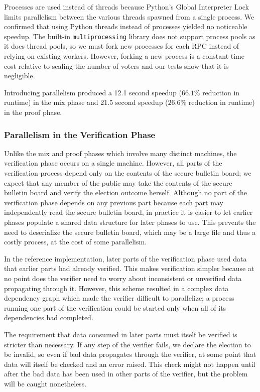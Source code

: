 Processes are used instead of threads because Python's Global Interpreter Lock limits parallelism between the various threads spawned from a single process. We confirmed that using Python threads instead of processes yielded no noticeable speedup. The built-in \texttt{multiprocessing} library does not support process pools as it does thread pools, so we must fork new processes for each RPC instead of relying on existing workers. However, forking a new process is a constant-time cost relative to scaling the number of voters and our tests show that it is negligible.

Introducing parallelism produced a 12.1 second speedup ($66.1\%$ reduction in runtime) in the mix phase and 21.5 second speedup ($26.6\%$ reduction in runtime) in the proof phase.

\subsubsection{Parallelism in the Verification Phase}

Unlike the mix and proof phases which involve many distinct machines, the verification phase occurs on a single machine. However, all parts of the verification process depend only on the contents of the secure bulletin board; we expect that any member of the public may take the contents of the secure bulletin board and verify the election outcome herself. Although no part of the verification phase depends on any previous part because each part may independently read the secure bulletin board, in practice it is easier to let earlier phases populate a shared data structure for later phases to use. This prevents the need to deserialize the secure bulletin board, which may be a large file and thus a costly process, at the cost of some parallelism.

In the reference implementation, later parts of the verification phase used data that earlier parts had already verified. This makes verification simpler because at no point does the verifier need to worry about inconsistent or unverified data propagating through it. However, this scheme resulted in a complex data dependency graph which made the verifier difficult to parallelize; a process running one part of the verification could be started only when all of its dependencies had completed.

The requirement that data consumed in later parts must itself be verified is stricter than necessary. If any step of the verifier fails, we declare the election to be invalid, so even if bad data propagates through the verifier, at some point that data will itself be checked and an error raised. This check might not happen until after the bad data has been used in other parts of the verifier, but the problem will be caught nonetheless.

